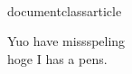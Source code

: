 \\documentclass{article}
\begin{document}
Yuo have missspeling
\\hoge
I has a pens.
\
\end{document}
